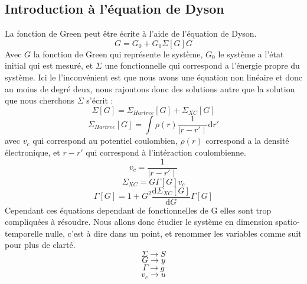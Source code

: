 \documentclass[12pt]{article}
\begin{document}
\subsection{Introduction \`a l'\'equation de Dyson}
La fonction de Green peut \^etre \'ecrite \`a l'aide de l'\'equation de Dyson. 
\begin{equation}
	G = G_0 + G_0 \Sigma[G] G
\end{equation}
Avec $G$ la fonction de Green qui repr\'esente le syst\`eme, $G_0$ le syst\`eme a l'\'etat initial qui est mesur\'e, et $\Sigma$ une fonctionnelle qui correspond a l'\'energie propre du syst\`eme.
Ici le l'inconv\'enient  est que nous avons une \'equation non lin\'eaire et donc au moins de degré deux, nous rajoutons donc des solutions autre que la solution que nous cherchons
$\Sigma$ s'\'ecrit :
\begin{equation}
	\Sigma[G] = \Sigma_{Hartree}[G] + \Sigma_{XC}[G]
\end{equation}
\begin{equation}
	\Sigma_{Hartree}[G] = \int \rho(r) \frac{1}{\mid r - r'\mid }\mathrm{d}r' 
\end{equation}
avec $v_c$ qui correspond au potentiel coulombien, $\rho(r)$ correspond a la densit\'e \'electronique, et $r-r'$
qui correspond à l'int\'eraction coulombienne.
\begin{equation}
	v_c =  \frac{1}{\mid r - r'\mid }
\end{equation}
\begin{equation}
	\Sigma_{XC} = G \Gamma[G] v_c
\end{equation}
\begin{equation}
	\Gamma[G] = 1 + G^2 \frac{\mathrm{d} \Sigma_{XC}[G]}{\mathrm{d}G} \Gamma[G]
\end{equation}
Cependant ces \'equations dependant de fonctionnelles de G elles sont trop compliqu\'ees \`a r\'esoudre. 
Nous allons donc \'etudier le syst\`eme en dimension spatio-temporelle nulle, c'est \`a dire dans un point, et renommer les variables comme suit
pour plus de clart\'e.
\begin{equation}
	\Sigma \longrightarrow S
\end{equation}
\begin{equation}
	G \longrightarrow y
\end{equation}
\begin{equation}
	\Gamma \longrightarrow g
\end{equation}
\begin{equation}
	v_c \longrightarrow u
\end{equation}
\end{document}
